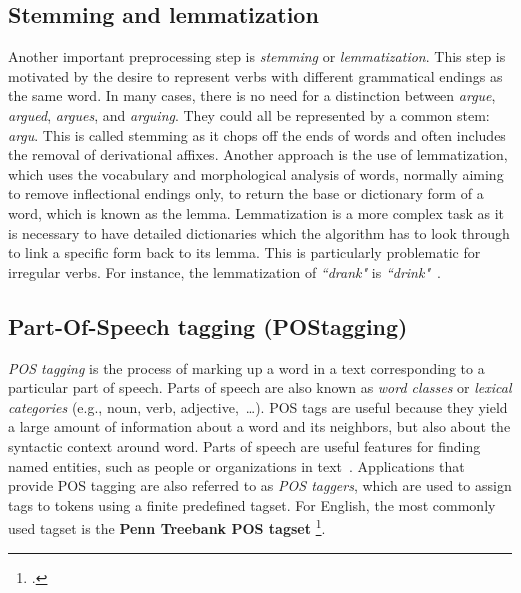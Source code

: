 \subsection{Stemming and  lemmatization}\label{subsec:steming}
Another important preprocessing step is \emph{stemming} or \emph{lemmatization}. This step is motivated by the desire to represent verbs with different grammatical endings as the same word.
In many cases, there is no need for a distinction between \emph{argue}, \emph{argued}, \emph{argues}, and \emph{arguing}. They could all be represented by a common stem: \emph{argu}. This is called stemming as it chops off the ends of words and often includes the removal of derivational affixes. Another approach is the use of lemmatization, which uses the vocabulary and morphological analysis of words, normally aiming to remove inflectional endings only, to return the base or dictionary form of a word, which is known as the lemma. Lemmatization is a more complex task as it is necessary to have detailed dictionaries which the algorithm has to look through to link a specific form back to its lemma. This is particularly problematic for irregular verbs. For instance,
the lemmatization of \emph{``drank"} is \emph{``drink"}~.

\subsection{Part-Of-Speech tagging (POStagging)}\label{subsec:pos}
\emph{POS tagging} is the process of marking up a word in a text corresponding to a particular part of speech. Parts of speech are also known as \emph{word classes} or \emph{lexical categories} (e.g., noun, verb, adjective,~\dots). POS tags are useful because they yield a large amount of information about a word and its neighbors, but also about the syntactic context around  word. Parts of speech are useful features for finding named entities, such as people or organizations in text~. Applications that provide POS tagging are also referred to as \emph{POS taggers}, which are used to assign tags to tokens using a finite predefined tagset. For English, the most commonly used tagset is the \textbf{Penn Treebank POS tagset} \footcite{https://www.ling.upenn.edu/courses/Fall_2003/ling001/penn_treebank_pos.html}. 

